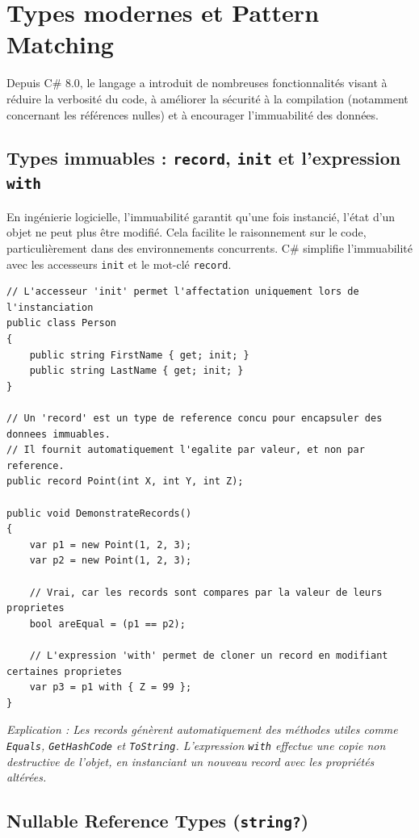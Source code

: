 \section{Types modernes et Pattern Matching}

Depuis C\# 8.0, le langage a introduit de nombreuses fonctionnalités visant à réduire la verbosité du code, à améliorer la sécurité à la compilation (notamment concernant les références nulles) et à encourager l'immuabilité des données.

\subsection{Types immuables : \texttt{record}, \texttt{init} et l'expression \texttt{with}}

En ingénierie logicielle, l'immuabilité garantit qu'une fois instancié, l'état d'un objet ne peut plus être modifié. Cela facilite le raisonnement sur le code, particulièrement dans des environnements concurrents. C\# simplifie l'immuabilité avec les accesseurs \texttt{init} et le mot-clé \texttt{record}.

\begin{lstlisting}[language={[Sharp]C}]
// L'accesseur 'init' permet l'affectation uniquement lors de l'instanciation
public class Person
{
    public string FirstName { get; init; }
    public string LastName { get; init; }
}

// Un 'record' est un type de reference concu pour encapsuler des donnees immuables.
// Il fournit automatiquement l'egalite par valeur, et non par reference.
public record Point(int X, int Y, int Z);

public void DemonstrateRecords()
{
    var p1 = new Point(1, 2, 3);
    var p2 = new Point(1, 2, 3);
    
    // Vrai, car les records sont compares par la valeur de leurs proprietes
    bool areEqual = (p1 == p2); 
    
    // L'expression 'with' permet de cloner un record en modifiant certaines proprietes
    var p3 = p1 with { Z = 99 };
}
\end{lstlisting}
\textit{Explication : Les records génèrent automatiquement des méthodes utiles comme \texttt{Equals}, \texttt{GetHashCode} et \texttt{ToString}. L'expression \texttt{with} effectue une copie non destructive de l'objet, en instanciant un nouveau record avec les propriétés altérées.}

\subsection{Nullable Reference Types (\texttt{string?})}

